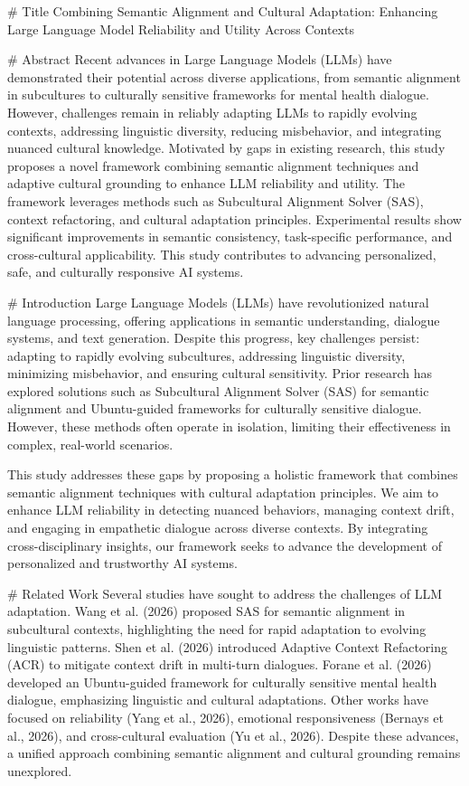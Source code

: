 # Title
Combining Semantic Alignment and Cultural Adaptation: Enhancing Large Language Model Reliability and Utility Across Contexts

# Abstract
Recent advances in Large Language Models (LLMs) have demonstrated their potential across diverse applications, from semantic alignment in subcultures to culturally sensitive frameworks for mental health dialogue. However, challenges remain in reliably adapting LLMs to rapidly evolving contexts, addressing linguistic diversity, reducing misbehavior, and integrating nuanced cultural knowledge. Motivated by gaps in existing research, this study proposes a novel framework combining semantic alignment techniques and adaptive cultural grounding to enhance LLM reliability and utility. The framework leverages methods such as Subcultural Alignment Solver (SAS), context refactoring, and cultural adaptation principles. Experimental results show significant improvements in semantic consistency, task-specific performance, and cross-cultural applicability. This study contributes to advancing personalized, safe, and culturally responsive AI systems.

# Introduction
Large Language Models (LLMs) have revolutionized natural language processing, offering applications in semantic understanding, dialogue systems, and text generation. Despite this progress, key challenges persist: adapting to rapidly evolving subcultures, addressing linguistic diversity, minimizing misbehavior, and ensuring cultural sensitivity. Prior research has explored solutions such as Subcultural Alignment Solver (SAS) for semantic alignment and Ubuntu-guided frameworks for culturally sensitive dialogue. However, these methods often operate in isolation, limiting their effectiveness in complex, real-world scenarios.

This study addresses these gaps by proposing a holistic framework that combines semantic alignment techniques with cultural adaptation principles. We aim to enhance LLM reliability in detecting nuanced behaviors, managing context drift, and engaging in empathetic dialogue across diverse contexts. By integrating cross-disciplinary insights, our framework seeks to advance the development of personalized and trustworthy AI systems.

# Related Work
Several studies have sought to address the challenges of LLM adaptation. Wang et al. (2026) proposed SAS for semantic alignment in subcultural contexts, highlighting the need for rapid adaptation to evolving linguistic patterns. Shen et al. (2026) introduced Adaptive Context Refactoring (ACR) to mitigate context drift in multi-turn dialogues. Forane et al. (2026) developed an Ubuntu-guided framework for culturally sensitive mental health dialogue, emphasizing linguistic and cultural adaptations. Other works have focused on reliability (Yang et al., 2026), emotional responsiveness (Bernays et al., 2026), and cross-cultural evaluation (Yu et al., 2026). Despite these advances, a unified approach combining semantic alignment and cultural grounding remains unexplored.

